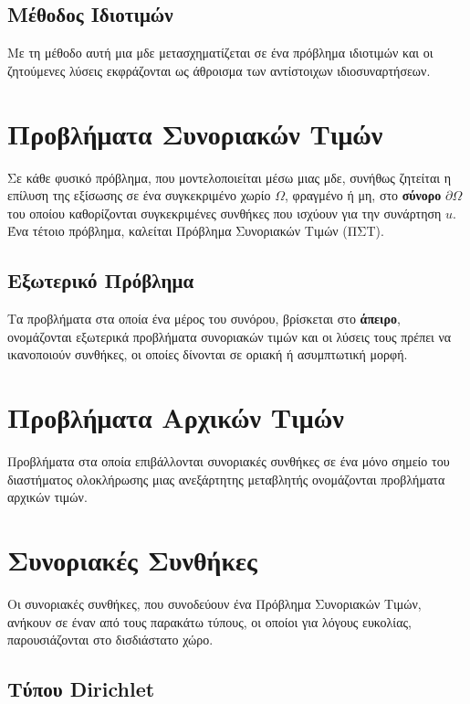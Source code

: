 \subsection*{Μέθοδος Ιδιοτιμών} 

Με τη μέθοδο αυτή μια μδε μετασχηματίζεται σε ένα πρόβλημα 
ιδιοτιμών και οι ζητούμενες λύσεις εκφράζονται ως άθροισμα των αντίστοιχων
ιδιοσυναρτήσεων.


\section*{Προβλήματα Συνοριακών Τιμών}

Σε κάθε φυσικό πρόβλημα, που μοντελοποιείται μέσω μιας μδε, συνήθως ζητείται η επίλυση 
της εξίσωσης σε ένα συγκεκριμένο χωρίο $ \Omega $, φραγμένο ή μη, στο \textbf{σύνορο} 
$ \partial \Omega $ του οποίου καθορίζονται συγκεκριμένες συνθήκες που ισχύουν για την 
συνάρτηση $ u $. Ένα τέτοιο πρόβλημα, καλείται \textcolor{Col1}{Πρόβλημα Συνοριακών 
Τιμών} (ΠΣΤ).

\subsection*{Εξωτερικό Πρόβλημα}

Τα προβλήματα στα οποία ένα μέρος του συνόρου, βρίσκεται στο \textbf{άπειρο}, 
ονομάζονται \textcolor{Col1}{εξωτερικά} προβλήματα συνοριακών τιμών και οι λύσεις τους 
πρέπει να ικανοποιούν συνθήκες, οι οποίες δίνονται σε οριακή ή ασυμπτωτική μορφή.

\section*{Προβλήματα Αρχικών Τιμών}

Προβλήματα στα οποία επιβάλλονται συνοριακές συνθήκες σε ένα μόνο σημείο του 
διαστήματος ολοκλήρωσης μιας ανεξάρτητης μεταβλητής ονομάζονται προβλήματα αρχικών 
τιμών.

\section*{Συνοριακές Συνθήκες}

Οι συνοριακές συνθήκες, που συνοδεύουν ένα Πρόβλημα Συνοριακών Τιμών, ανήκουν σε έναν 
από τους παρακάτω τύπους, οι οποίοι για λόγους ευκολίας, παρουσιάζονται στο δισδιάστατο 
χώρο.

\subsection*{Τύπου Dirichlet}

